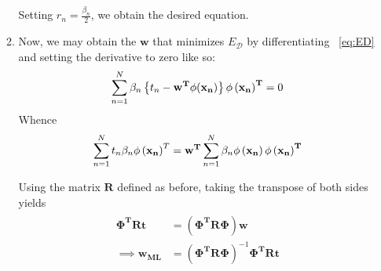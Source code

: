 \documentclass[reqno]{amsart}
\begin{document}
\begin{enumerate}[label=\textbf{(\Roman*)}]
\begin{enumerate}[label=\textbf{(\alph*)}]
            Setting \(r_n = \frac{\beta_n}{2}\), we obtain the desired equation.

            \item Now, we may obtain the \(\mathbf{w}\) that minimizes \(E_\mathcal{D}\) by differentiating ~\eqref{eq:ED} and setting the derivative to zero like so:
        \[\sum_{n = 1}^{N} \beta_n \left\{t_n - \mathbf{w^T \phi(x_n)}\right\} \mathbf{\phi\left(x_n\right)^T} = 0\]
        Whence 
        \[ \sum_{n = 1}^{N} t_n \beta_n \mathbf{\phi\left(x_n\right)}^T = \mathbf{w^T}\sum_{n = 1}^{N} \beta_n \mathbf{\phi\left(x_n\right)\phi\left(x_n\right)^T}\]

        Using the matrix \(\mathbf{R}\) defined as before, taking the transpose of both sides yields
        \begin{align}
            \begin{split}
                \mathbf{\Phi^T R t} &= \mathbf{(\Phi^T R \Phi) w} \\
                \implies \mathbf{w_{ML}} &= (\mathbf{\Phi^T R \Phi})^{-1} \mathbf{\Phi^T R t}
            \end{split}
        \end{align}
        \end{enumerate}
        
    \end{enumerate}
\end{document}
